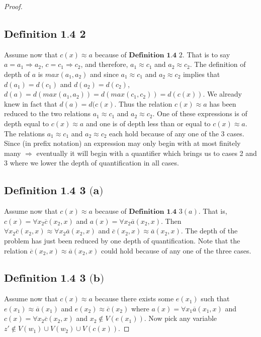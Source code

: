 \documentclass{article}
\theoremstyle{problemstyle}
\theoremstyle{lemmastyle}
\theoremstyle{theoremstyle}
\theoremstyle{problemstyle}
\begin{document}
\begin{proof}
\subsection*{$\textbf{Definition 1.4}$ $\textbf{2}$} 
Assume now that $c(x) \approx a$ because of $\textbf{Definition 1.4}$ $2$. That is to say $a = a_1 \Rightarrow a_2$, $c = c_1 \Rightarrow c_2$, and therefore, $a_1 \approx c_1$ and $a_2 \approx c_2$. The definition of depth of $a$ is $max(a_1, a_2)$ and since  $a_1 \approx c_1$ and $a_2 \approx c_2$ implies that $d(a_1) = d(c_1)$ and $d(a_2) = d(c_2)$, $d(a) = d(max(a_1, a_2)) = d(max(c_1, c_2)) = d(c(x))$. We already knew in fact that $d(a) = d(c(x)$. Thus the relation $c(x) \approx a$ has been reduced to the two relations $a_1 \approx c_1$ and $a_2 \approx c_2$. One of these expressions is of depth equal to $c(x) \approx a$ and one is of depth less than or equal to $c(x) \approx a$.  The relations $a_1 \approx c_1$ and $a_2 \approx c_2$ each hold because of any one of the $3$ cases. Since (in prefix notation) an expression may only begin with at most finitely many $\Rightarrow$ eventually it will begin with a quantifier which brings us to cases 2 and 3 where we lower the depth of quantification in all cases. 

\subsection*{$\textbf{Definition 1.4}$ $\textbf{3 (a)}$} 
Assume now that $c(x) \approx a$ because of $\textbf{Definition 1.4}$ $3 (a)$. That is, $c(x) = \forall x_2\overline{c}(x_2,x)$ and $a(x) = \forall x_2\overline{a}(x_2,x)$. Then $\forall x_2\overline{c}(x_2,x) \approx \forall x_2\overline{a}(x_2,x)$ and $\overline{c}(x_2,x) \approx \overline{a}(x_2,x)$. The depth of the problem has just been reduced by one depth of quantification. Note that the relation $\overline{c}(x_2,x) \approx \overline{a}(x_2,x)$ could hold because of any one of the three cases. 

\subsection*{$\textbf{Definition 1.4}$ $\textbf{3 (b)}$} 
Assume now that $c(x) \approx a$ because there exists some $e(x_1)$ such that $e(x_1) \approx \overline{a}(x_1)$ and $e(x_2) \approx \overline{c}(x_2)$ where $a(x) = \forall x_1 \overline{a}(x_1,x)$ and $c(x) = \forall x_2 \overline{c}(x_2,x)$ and $x_2 \notin V(e(x_1))$. Now pick any variable $z' \notin V(w_1) \cup V(w_2)\cup V(c(x))$.  


\end{proof}
\end{document}
